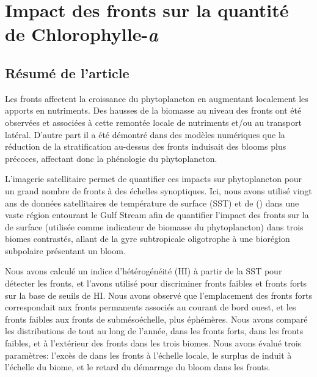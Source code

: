 
\chapter{Impact des fronts sur la quantité de Chlorophylle-\textit{a}}
\addChpLof
\label{chp:res-chl}
\graphicspath{{resources/res_chl}}

{
  \hypersetup{hidelinks}
  \minitoc%
}


\section{Résumé de l'article}
\label{sec:resume-article}

Les fronts affectent la croissance du phytoplancton en augmentant localement les apports en nutriments.
Des hausses de la biomasse au niveau des fronts ont été observées et associées à cette remontée locale de nutriments et/ou au transport latéral.
D'autre part il a été démontré dans des modèles numériques que la réduction de la stratification au-dessus des fronts induisait des blooms plus précoces, affectant donc la phénologie du phytoplancton.

L'imagerie satellitaire permet de quantifier ces impacts sur phytoplancton pour un grand nombre de fronts à des échelles synoptiques.
Ici, nous avons utilisé vingt ans de données satellitaires de température de surface (SST) et de  () dans une vaste région entourant le Gulf Stream afin de quantifier l'impact des fronts sur la  de surface (utilisée comme indicateur de biomasse du phytoplancton) dans trois biomes contrastés, allant de la gyre subtropicale oligotrophe à une biorégion subpolaire présentant un bloom.

Nous avons calculé un indice d'hétérogénéité (HI) à partir de la SST pour détecter les fronts, et l'avons utilisé pour discriminer fronts faibles et fronts forts sur la base de seuils de HI.
Nous avons observé que l'emplacement des fronts forts correspondait aux fronts permanents associés au courant de bord ouest, et les fronts faibles aux fronts de submésoéchelle, plus éphémères.
Nous avons comparé les distributions de  tout au long de l'année, dans les fronts forts, dans les fronts faibles, et à l'extérieur des fronts dans les trois biomes.
Nous avons évalué trois paramètres: l'excès de  dans les fronts à l'échelle locale, le surplus de  induit à l'échelle du biome, et le retard du démarrage du bloom dans les fronts.

